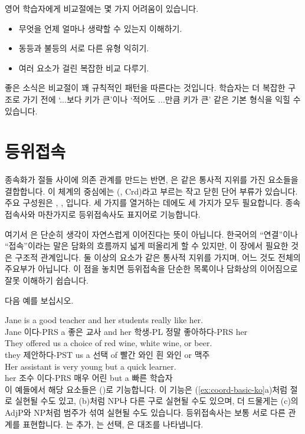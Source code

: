 영어 학습자에게 비교절에는 몇 가지 어려움이 있습니다.
\begin{itemize}[noitemsep]
    \item 무엇을 언제 얼마나 생략할 수 있는지 이해하기.
    \item 동등과 불등의 서로 다른 유형 익히기.
    \item 여러 요소가 걸린 복잡한 비교 다루기.
\end{itemize}

좋은 소식은 비교절이 꽤 규칙적인 패턴을 따른다는 것입니다. 학습자는 더 복잡한 구조로 가기 전에  `...보다 키가 큰'이나  `적어도 ...만큼 키가 큰' 같은 기본 형식을 익힐 수 있습니다.

\section{등위접속}\label{sec:coordination-ko}

종속화가 절들 사이에 의존 관계를 만드는 반면, 은 같은 통사적 지위를 가진 요소들을 결합합니다. 이 체계의 중심에는 (, Crd)라고 부르는 작고 닫힌 단어 부류가 있습니다. 주요 구성원은 , , 입니다. 세 가지를 열거하는 데에도 세 가지가 모두 필요합니다. 종속 접속사와 마찬가지로 등위접속사도 표지어로 기능합니다.

여기서 은 단순히 생각이 자연스럽게 이어진다는 뜻이 아닙니다. 한국어의 \enquote{연결}이나 \enquote{접속}이라는 말은 담화의 흐름까지 넓게 떠올리게 할 수 있지만, 이 장에서 필요한 것은 구조적 관계입니다. 둘 이상의 요소가 같은 통사적 지위를 가지며, 어느 것도 전체의 주요부가 아닙니다. 이 점을 놓치면 등위접속을 단순한 목록이나 담화상의 이어짐으로 잘못 이해하기 쉽습니다.

다음 예를 보십시오.

\ea \label{ex:coord-basic-ko}
    \ea \gll {\ob}Jane is a good teacher{\cb} {\ob}and her students really like her{\cb}.\\
        Jane 이다-PRS a 좋은 교사 and her 학생-PL 정말 좋아하다-PRS her\\
    \glt {}
    \ex \gll They offered us a choice of {\ob}red wine{\cb}, {\ob}white wine{\cb}, {\ob}or beer{\cb}.\\
        they 제안하다-PST us a 선택 of 빨간 와인 흰 와인 or 맥주\\
    \glt {}
    \ex \gll Her assistant is {\ob}very young{\cb} {\ob}but a quick learner{\cb}.\\
        her 조수 이다-PRS 매우 어린 but a 빠른 학습자\\
    \glt {}
    \z
\z
이 예들에서 해당 요소들은 ()로 기능합니다. 이 기능은 (\ref{ex:coord-basic-ko}a)처럼 절로 실현될 수도 있고, (b)처럼 NP나 다른 구로 실현될 수도 있으며, 더 드물게는 (c)의 AdjP와 NP처럼 범주가 섞여 실현될 수도 있습니다. 등위접속사는 보통 서로 다른 관계를 표현합니다. 는 추가, 는 선택, 은 대조를 나타냅니다.

